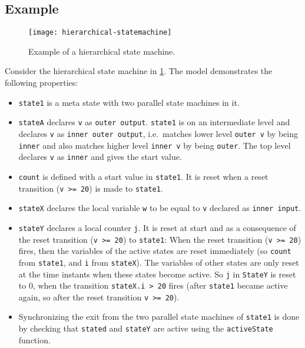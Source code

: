 \subsection{Example}\label{example}

\begin{figure}[H]
  \begin{center}
    \texttt{[image: hierarchical-statemachine]}
  \end{center}
  \caption{Example of a hierarchical state machine.}
  \label{fig:hierarchical-statemachine}
\end{figure}

\begin{example}
Consider the hierarchical state machine in \cref{fig:hierarchical-statemachine}.  The model demonstrates the following properties:
\begin{itemize}
\item
  \lstinline!state1! is a meta state with two parallel state machines in it.
\item
  \lstinline!stateA! declares \lstinline!v! as \lstinline!outer output!. \lstinline!state1! is on an intermediate
  level and declares \lstinline!v! as \lstinline!inner outer output!, i.e.\ matches lower level
  \lstinline!outer v! by being \lstinline!inner! and also matches higher level \lstinline!inner v! by being
  \lstinline!outer!. The top level declares \lstinline!v! as \lstinline!inner! and gives the start value.
\item
  \lstinline!count! is defined with a start value in \lstinline!state1!. It is reset when
  a reset transition (\lstinline!v >= 20!) is made to \lstinline!state1!.
\item
  \lstinline!stateX! declares the local variable \lstinline!w! to be equal to \lstinline!v! declared
  as \lstinline!inner input!.
\item
  \lstinline!stateY! declares a local counter \lstinline!j!. It is reset at start and as a
  consequence of the reset transition (\lstinline!v >= 20!) to \lstinline!state1!:
  When the reset transition (\lstinline!v >= 20!) fires, then the variables of the
  active states are reset immediately (so \lstinline!count! from \lstinline!state1!, and \lstinline!i!
  from \lstinline!stateX!). The variables of other states are only reset at the time
  instants when these states become active. So \lstinline!j! in \lstinline!StateY! is reset to
  0, when the transition \lstinline!stateX.i > 20! fires (after \lstinline!state1!
  became active again, so after the reset transition \lstinline!v >= 20!).
\item
  Synchronizing the exit from the two parallel state machines of
  \lstinline!state1! is done by checking that \lstinline!stated! and \lstinline!stateY! are active using the
  \lstinline!activeState! function.
\end{itemize}


\end{example}
